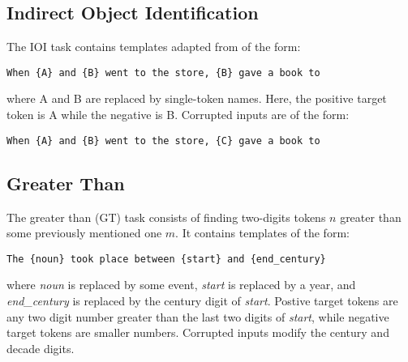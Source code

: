 \documentclass{article}
\begin{document}
\subsection{Indirect Object Identification}
\label{app:IOI}

The IOI task contains templates adapted from \citet{wang2022interpretabilityCircuits} of the form:

{\small
\begin{verbatim}
When {A} and {B} went to the store, {B} gave a book to
\end{verbatim}
}

where A and B are replaced by single-token names. Here, the positive target token is A while the negative is B. Corrupted inputs are of the form:

{\small
\begin{verbatim}
When {A} and {B} went to the store, {C} gave a book to
\end{verbatim}
}

\subsection{Greater Than}
\label{app:GT}

The greater than (GT) task consists of finding two-digits tokens $n$ greater than some previously mentioned one $m$. It contains templates of the form:

{\small
\begin{verbatim}
The {noun} took place between {start} and {end_century}
\end{verbatim}
}

where \emph{noun} is replaced by some event, \emph{start} is replaced by a year, and \emph{end\_century} is replaced by the century digit of \emph{start}. Postive target tokens are any two digit number greater than the last two digits of \emph{start}, while negative target tokens are smaller numbers. Corrupted inputs modify the century and decade digits.
\end{document}

